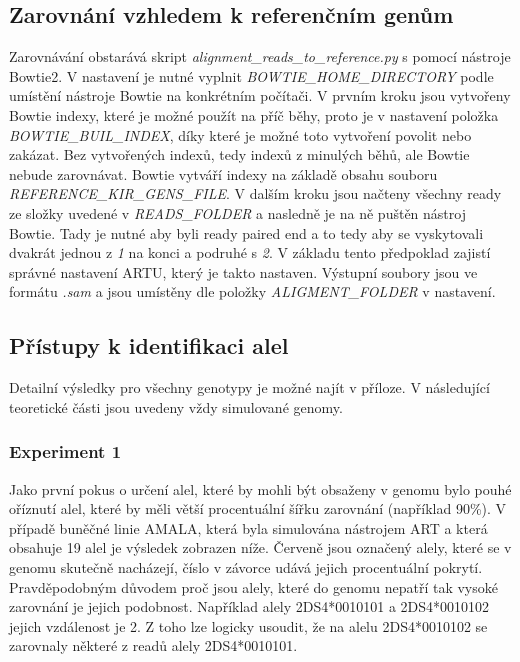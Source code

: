 \documentclass[czech,DP]{thesiskiv}
\numberwithin{equation}{section}
\begin{document}
\subsection{Zarovnání vzhledem k referenčním genům}
Zarovnávání obstarává skript \textit{alignment\_reads\_to\_reference.py} s pomocí nástroje Bowtie2. V nastavení je nutné vyplnit \textit{BOWTIE\_HOME\_DIRECTORY} podle umístění nástroje Bowtie na konkrétním počítači. V prvním kroku jsou vytvořeny Bowtie indexy, které je možné použít na příč běhy, proto je v nastavení položka \textit{BOWTIE\_BUIL\_INDEX}, díky které je možné toto vytvoření povolit nebo zakázat. Bez vytvořených indexů, tedy indexů z minulých běhů, ale Bowtie nebude zarovnávat. Bowtie vytváří indexy na základě obsahu souboru \textit{REFERENCE\_KIR\_GENS\_FILE}. V dalším kroku jsou načteny všechny ready ze složky uvedené v \textit{READS\_FOLDER} a nasledně je na ně puštěn nástroj Bowtie. Tady je nutné aby byli ready paired end a to tedy aby se vyskytovali dvakrát jednou z \textit{1} na konci a podruhé s \textit{2}. V základu tento předpoklad zajistí správné nastavení ARTU, který je takto nastaven. Výstupní soubory jsou ve formátu \textit{.sam} a jsou umístěny dle položky \textit{ALIGMENT\_FOLDER} v nastavení. 

\subsection{Přístupy k identifikaci alel}
Detailní výsledky pro všechny genotypy je možné najít v příloze. V následující teoretické části jsou uvedeny vždy simulované genomy.

\subsubsection{Experiment 1}
Jako první pokus o určení alel, které by mohli být obsaženy v genomu bylo pouhé oříznutí alel, které by měli větší procentuální šířku zarovnání (například 90\%).  V případě buněčné linie AMALA, která byla simulována nástrojem ART a která obsahuje 19 alel je výsledek zobrazen níže. Červeně jsou označený alely, které se v genomu skutečně nacházejí, číslo v závorce udává jejich procentuální pokrytí. Pravděpodobným důvodem proč jsou alely, které do genomu nepatří tak vysoké zarovnání je jejich podobnost. Například alely 2DS4*0010101 a 2DS4*0010102 jejich vzdálenost je 2. Z toho lze logicky usoudit, že na alelu 2DS4*0010102 se zarovnaly některé z readů alely 2DS4*0010101.
\end{document}
